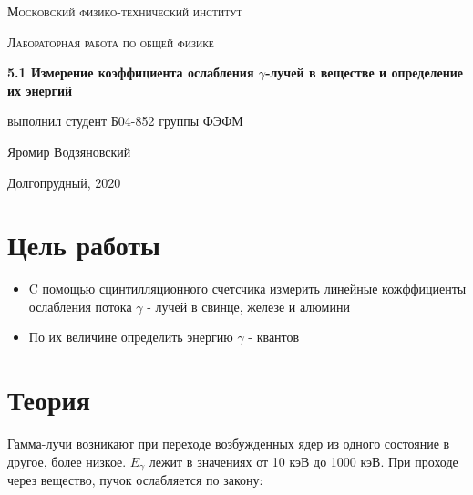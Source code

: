 \documentclass[a4paper]{article}
\begin{document}
\graphicspath{ {pictures/} }

\begin{titlepage}
	\centering
	\vspace{5cm}
    {\scshape\LARGE Московский физико-технический институт\par}
	\vspace{5cm}
	{\scshape\Large Лабораторная работа по общей физике \par}
	\vspace{1cm}
    {\huge\bfseries  5.1 Измерение коэффициента ослабления $\gamma$-лучей в веществе
    и определение их энергий \par}
	\vspace{1cm}
	\vfill
    \begin{flushright}
        {\large выполнил студент Б04-852 группы ФЭФМ}\par
        \vspace{0.3cm}
        {\LARGE Яромир Водзяновский}
    \end{flushright}
	\vfill
Долгопрудный, 2020
\end{titlepage}

\pagestyle{fancy} 
\fancyhead[C]{}
\fancyfoot[C]{ \noindent\rule{\textwidth}{0.4pt} \thepage }

\tableofcontents

\newpage



\section{Цель работы}

\begin{itemize}
    \item  C помощью сцинтилляционного счетсчика измерить линейные кожффициенты ослабления потока $\gamma$ - лучей в свинце,
    железе и алюмини

    \item  По их величине определить энергию $\gamma$ - квантов
\end{itemize}



\section{Теория}

Гамма-лучи возникают при переходе возбужденных ядер из одного состояние в другое, более низкое. 
$E_{\gamma}$ лежит в значениях от 10 кэВ до 1000 кэВ. При проходе через вещество, пучок ослабляется по закону:
\end{document}
